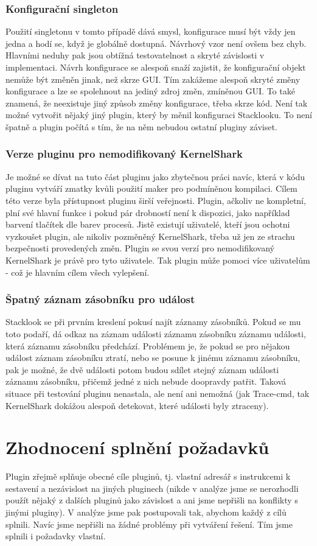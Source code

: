 \subsubsection*{Konfigurační singleton}
Použití singletonu v tomto případě dává smysl, konfigurace musí být vždy jen jedna a hodí se, když je globálně dostupná. Návrhový vzor není ovšem bez chyb. Hlavními neduhy pak jsou obtížná testovatelnost a skryté závislosti v implementaci. Návrh konfigurace se alespoň snaží zajistit, že konfigurační objekt nemůže být změněn jinak, než skrze GUI. Tím zakážeme alespoň skryté změny konfigurace a lze se spolehnout na jediný zdroj změn, zmíněnou GUI. To také znamená, že neexistuje jiný způsob změny konfigurace, třeba skrze kód. Není tak možné vytvořit nějaký jiný plugin, který by měnil konfiguraci Stacklooku. To není špatně a plugin počítá s tím, že na něm nebudou ostatní pluginy záviset.

\subsubsection*{Verze pluginu pro nemodifikovaný KernelShark}
Je možné se dívat na tuto část pluginu jako zbytečnou práci navíc, která v kódu pluginu vytváří zmatky kvůli použití maker pro podmíněnou kompilaci. Cílem této verze byla přístupnost pluginu širší veřejnosti. Plugin, ačkoliv ne kompletní, plní své hlavní funkce i pokud pár drobností není k dispozici, jako například barvení tlačítek dle barev procesů. Jistě existují uživatelé, kteří jsou ochotni vyzkoušet plugin, ale nikoliv pozměněný KernelShark, třeba už jen ze strachu bezpečnosti provedených změn. Plugin se svou verzí pro nemodifikovaný KernelShark je právě pro tyto uživatele. Tak plugin může pomoci více uživatelům - což je hlavním cílem všech vylepšení.

\subsubsection*{Špatný záznam zásobníku pro událost}
Stacklook se při prvním kreslení pokusí najít záznamy zásobníků. Pokud se mu toto podaří, dá odkaz na záznam události záznamu zásobníku záznamu události, která záznamu zásobníku předchází. Problémem je, že pokud se pro nějakou událost záznam zásobníku ztratí, nebo se posune k jinému záznamu zásobníku, pak je možné, že dvě události potom budou sdílet stejný záznam události záznamu zásobníku, přičemž jedné z nich nebude doopravdy patřit. Taková situace při testování pluginu nenastala, ale není ani nemožná (jak Trace-cmd, tak KernelShark dokážou alespoň detekovat, které události byly ztraceny). 

\section{Zhodnocení splnění požadavků}
Plugin zřejmě splňuje obecné cíle pluginů, tj. vlastní adresář s instrukcemi k sestavení a nezávislost na jiných pluginech (nikde v analýze jsme se nerozhodli použít nějaký z dalších pluginů jako závislost a ani jsme nepřišli na konflikty s jinými pluginy). V analýze jsme pak postupovali tak, abychom každý z cílů splnili. Navíc jsme nepřišli na žádné problémy při vytváření řešení. Tím jsme splnili i požadavky vlastní.